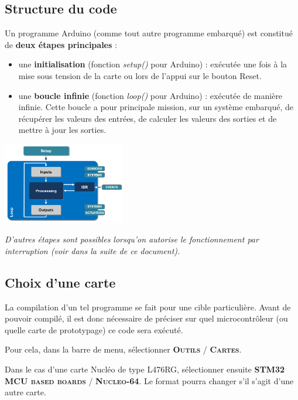 \documentclass[a4paper,11pt,titlepage]{article} %
\begin{document}
\subsection{Structure du code}

Un programme Arduino (comme tout autre programme embarqué) est constitué de \textbf{deux étapes principales} : 

\begin{itemize}
	\item une \textbf{initialisation} (fonction \textsl{setup()} pour Arduino) : exécutée une fois à la mise sous tension de la carte ou lors de l'appui sur le bouton Reset.
	\item une \textbf{boucle infinie} (fonction \textsl{loop()} pour Arduino) : exécutée de manière infinie. Cette boucle a pour principale mission, sur un système embarqué, de récupérer les valeurs des entrées, de calculer les valeurs des sorties et de mettre à jour les sorties.
\end{itemize}

\begin{center}
	\includegraphics[width=0.4\textwidth]{images/arduino_program_structure.png}
\end{center}

\textit{D'autres étapes sont possibles lorsqu'on autorise le fonctionnement par interruption (voir dans la suite de ce document).}



\subsection{Choix d'une carte}

La compilation d'un tel programme se fait pour une cible particulière. Avant de pouvoir compilé, il est donc nécessaire de préciser sur quel microcontrôleur (ou quelle carte de prototypage) ce code sera exécuté.

Pour cela, dans la barre de menu, sélectionner \textsc{\textbf{Outils} / \textbf{Cartes}}.

Dans le cas d'une carte Nucléo de type L476RG, sélectionner ensuite \textsc{\textbf{STM32 MCU based boards} / \textbf{Nucleo-64}}. Le format pourra changer s'il s'agit d'une autre carte.
\end{document}
